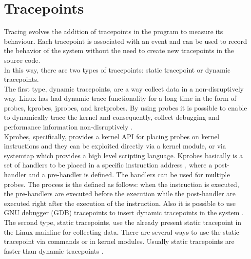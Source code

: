 \section{Tracepoints}
Tracing evolves the addition of tracepoints in the program to measure its behaviour.  Each tracepoint is associated with an event and can be used to record the behavior of the system without the need to create new tracepoints in the source code.\\
In this way, there are two types of tracepoints: static tracepoint or dynamic tracepoints.\\
The first type, dynamic tracepoints, are a way collect data in a non-disruptively way. Linux has had dynamic trace functionality for a long time in the form of probes, kprobes, jprobes, and kretprobes. By using probes it is possible to enable to dynamically trace the kernel and consequently, collect debugging and performance information non-disruptively \cite{Yanok2015TLV28183022818303}.\\
Kprobes, specifically, provides a kernel API for placing probes on kernel instructions and they can be exploited directly via a kernel module, or via systemtap which provides a high level scripting language. Kprobes basically is a set of handlers to be placed in a specific instruction address \cite{kprobes}, where a post-handler and a pre-handler is defined. The handlers can be used for multiple probes. The process is the defined as follows: when the instruction is executed, the pre-handlers are executed before the execution while the post-handler are executed right after the execution of the instruction. Also it is possible to use GNU debugger (GDB) tracepoints to insert dynamic tracepoints in the system \cite{sucha_tracepoint}. \\
The second type, static tracepoints, use the already present static tracepoint in the Linux mainline for collecting data. There are several ways to use the static tracepoint via commands or in kernel modules.  Usually static tracepoints are faster than dynamic tracepoints \cite{giraldeau-ols2011}.\\
